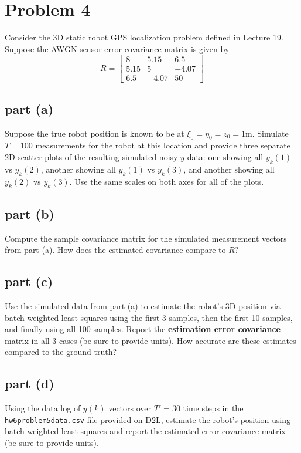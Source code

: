 \documentclass[11pt]{article}
\begin{document}
\section*{Problem 4}
Consider the 3D static robot GPS localization problem defined in Lecture 19. Suppose the AWGN sensor error covariance matrix is given by 
\begin{equation*}
	R=\begin{bmatrix} 8 & 5.15 & 6.5 \\ 5.15 & 5 & -4.07 \\ 6.5 & -4.07 & 50 \end{bmatrix}
\end{equation*}

\subsection*{part (a)}
Suppose the true robot position is known to be at $\xi_0=\eta_0=z_0=1\text{m}$. Simulate $T=100$ measurements for the robot at this location and provide three separate 2D scatter plots of the resulting simulated noisy $y$ data: one showing all $y_k(1)$ vs $y_k(2)$, another showing all $y_k(1)$ vs $y_k(3)$, and another showing all $y_k(2)$ vs $y_k(3)$. Use the same scales on both axes for all of the plots.

\subsection*{part (b)}
Compute the sample covariance matrix for the simulated measurement vectors from part (a). How does the estimated covariance compare to $R$?

\subsection*{part (c)}
Use the simulated data from part (a) to estimate the robot's 3D position via batch weighted least squares using the first 3 samples, then the first 10 samples, and finally using all 100 samples. Report the \textbf{estimation error covariance} matrix in all 3 cases (be sure to provide units). How accurate are these estimates compared to the ground truth?

\subsection*{part (d)}
Using the data log of $y(k)$ vectors over $T'=30$ time steps in the \texttt{hw6problem5data.csv} file provided on D2L, estimate the robot's position using batch weighted least squares and report the estimated error covariance matrix (be sure to provide units).
\end{document}
